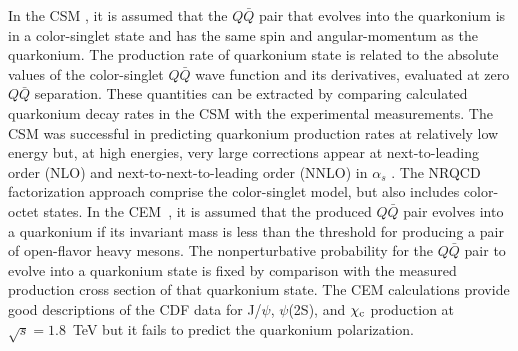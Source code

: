 \documentclass[12pt,a4paper,final]{iopart}
\begin{document}
  In the CSM \cite{Einhorn:1975ua,Ellis:1976fj,Carlson:1976cd,Berger:1980ni},
it is assumed that the $Q\bar Q$ pair that evolves into
the quarkonium is in a color-singlet state and has the same spin
and angular-momentum as the quarkonium. 
 The production rate of quarkonium state is related to 
the absolute values of the color-singlet $Q\bar Q$ wave function and 
its derivatives, evaluated at zero $Q\bar Q$ separation. These quantities 
can be extracted by comparing calculated quarkonium decay
rates in the CSM with the experimental measurements. 
 The CSM was successful in predicting quarkonium production rates at
relatively low energy \cite{Schuler:1994hy} but, at high
energies, very large corrections appear at next-to-leading
order (NLO) and next-to-next-to-leading order (NNLO) in $\alpha_s$
\cite{Artoisenet:2007xi,Campbell:2007ws,Artoisenet:2008fc}.
  The NRQCD factorization approach comprise the color-singlet model, 
but also includes color-octet states.
    In the CEM~\cite{Fritzsch:1977ay,Amundson:1995em,Amundson:1996qr}, it
is assumed that the produced $Q\bar Q$ pair evolves into a quarkonium
if its invariant mass is less than the threshold for producing a 
pair of open-flavor heavy mesons. 
 The nonperturbative probability for the $Q\bar Q$ pair to evolve into 
a quarkonium state is fixed by comparison with the measured production
cross section of that quarkonium state.
 The CEM calculations provide good descriptions of the CDF data for J/$\psi$,
$\psi$(2S), and $\chi_{\rm c}$ production at $\sqrt{s}=1.8$~TeV
\cite{Amundson:1996qr} but it fails to predict the quarkonium 
polarization.
\end{document}
